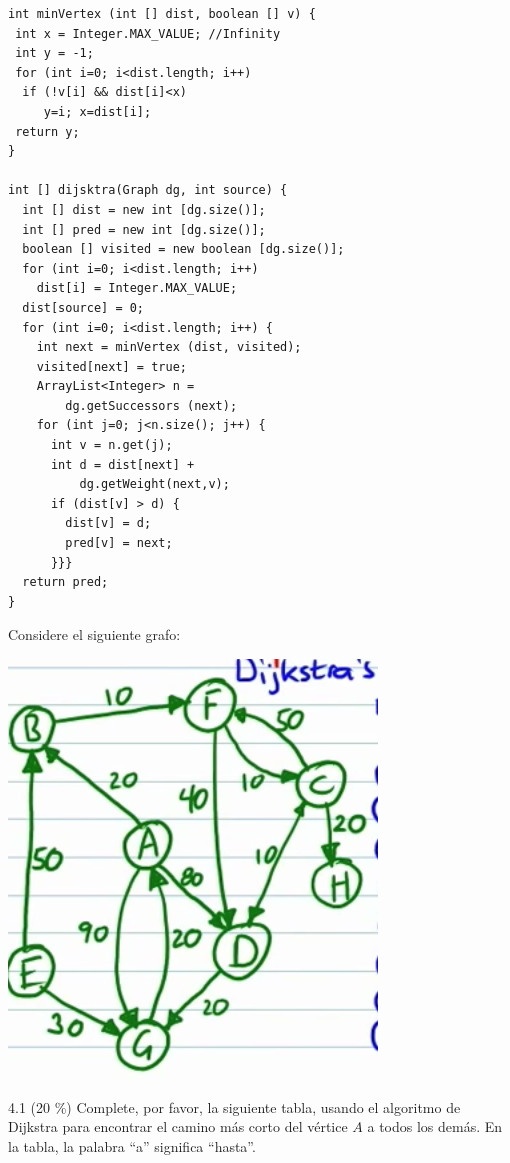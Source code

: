 \documentclass[twocolumn]{article}
\begin{document}
{\small
\begin{verbatim}
int minVertex (int [] dist, boolean [] v) {
 int x = Integer.MAX_VALUE; //Infinity
 int y = -1;   
 for (int i=0; i<dist.length; i++) 
  if (!v[i] && dist[i]<x) 
     y=i; x=dist[i];
 return y;
}
      
int [] dijsktra(Graph dg, int source) {
  int [] dist = new int [dg.size()]; 
  int [] pred = new int [dg.size()]; 
  boolean [] visited = new boolean [dg.size()]; 
  for (int i=0; i<dist.length; i++) 
    dist[i] = Integer.MAX_VALUE; 
  dist[source] = 0;
  for (int i=0; i<dist.length; i++) {
    int next = minVertex (dist, visited);
    visited[next] = true;
    ArrayList<Integer> n =
        dg.getSuccessors (next); 
    for (int j=0; j<n.size(); j++) {
      int v = n.get(j);
      int d = dist[next] + 
          dg.getWeight(next,v);
      if (dist[v] > d) {
        dist[v] = d;
        pred[v] = next;
      }}}
  return pred;  
}
\end{verbatim}
}

Considere el siguiente grafo:

\begin{center}
\includegraphics[scale=0.3]{dij.png}
\end{center}

4.1 (20 \%) Complete, por favor, la siguiente tabla, usando
el algoritmo de Dijkstra para encontrar el camino más corto del vértice $A$ a todos los demás. En la tabla, la palabra ``a'' significa ``hasta''.
\end{document}
